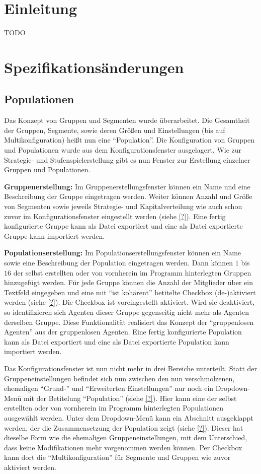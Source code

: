 \documentclass[parskip=full,11pt]{scrartcl}
\begin{document}
\section{Einleitung}
TODO

\section{Spezifikationsänderungen}

\subsection{Populationen}
Das Konzept von Gruppen und Segmenten wurde überarbeitet. Die Gesamtheit der Gruppen, Segmente, sowie deren Größen und Einstellungen (bis auf Multikonfiguration) heißt nun eine \enquote{Population}. Die Konfiguration von Gruppen und Populationen wurde aus dem Konfigurationsfenster ausgelagert. Wie zur Strategie- und Stufenspielerstellung gibt es nun Fenster zur Erstellung einzelner Gruppen und Populationen.

\textbf{Gruppenerstellung:}
Im Gruppenerstellungsfenster können ein Name und eine Beschreibung der Gruppe eingetragen werden. Weiter können Anzahl und Größe von Segmenten sowie jeweils Strategie- und Kapitalverteilung wie auch schon zuvor im Konfigurationsfenster eingestellt werden (siehe \cref{?}). Eine fertig konfigurierte Gruppe kann als Datei exportiert und eine als Datei exportierte Gruppe kann importiert werden.

\textbf{Populationserstellung:}
Im Populationserstellungsfenster können ein Name sowie eine Beschreibung der Population eingetragen werden. Dann können \(1\) bis \(16\) der selbst erstellten oder von vornherein im Programm hinterlegten Gruppen hinzugefügt werden. Für jede Gruppe können die Anzahl der Mitglieder über ein Textfeld eingegeben und eine mit \enquote{ist kohärent} betitelte Checkbox (de-)aktiviert werden (siehe \cref{?}). Die Checkbox ist voreingestellt aktiviert. Wird sie deaktiviert, so identifizieren sich Agenten dieser Gruppe gegenseitig nicht mehr als Agenten derselben Gruppe. Diese Funktionalität realisiert das Konzept der \enquote{gruppenlosen Agenten} aus der gruppenlosen Agenten. Eine fertig konfigurierte Population kann als Datei exportiert und eine als Datei exportierte Population kann importiert werden.

Das Konfigurationsfenster ist nun nicht mehr in drei Bereiche unterteilt. Statt der Gruppeneinstellungen befindet sich nun zwischen den nun verschmolzenen, ehemaligen \enquote{Grund-} und \enquote{Erweiterten Einstellungen} nur noch ein Dropdown-Menü mit der Betitelung \enquote{Population} (siehe \cref{?}). Hier kann eine der selbst erstellten oder von vornherein im Programm hinterlegten Populationen ausgewählt werden. Unter dem Dropdown-Menü kann ein Abschnitt ausgeklappt werden, der die Zusammensetzung der Population zeigt (siehe \cref{?}). Dieser hat dieselbe Form wie die ehemaligen Gruppeneinstellungen, mit dem Unterschied, dass keine Modifikationen mehr vorgenommen werden können. Per Checkbox kann dort die \enquote{Multikonfiguration} für Segmente und Gruppen wie zuvor aktiviert werden.
\end{document}

